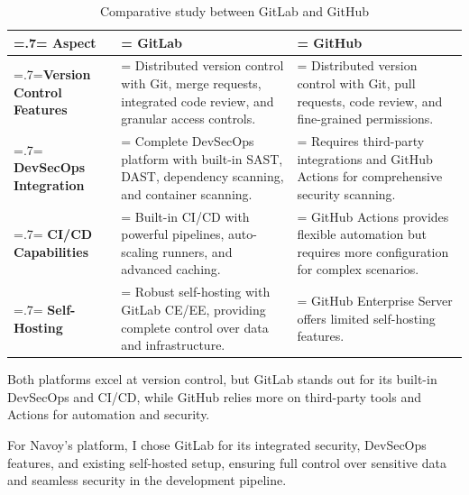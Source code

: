 \begin{table}[H]
    \renewcommand{\arraystretch}{1.5}%
    \caption{Comparative study between GitLab and GitHub}
    \centering
    \medskip
    \begin{tabularx}{1\textwidth} {
            | >{\hsize=.7\hsize\linewidth=\hsize\centering\arraybackslash}X
            | >{\hsize=1.15\hsize\linewidth=\hsize\justifying\arraybackslash}X
            | >{\hsize=1.15\hsize\linewidth=\hsize\justifying\arraybackslash}X |}
        \hline
        \rowcolor{primary} \textbf {Aspect} & \textbf {GitLab}                                                                                                      & \textbf {GitHub}                                                                                             \\
        \hline
        \textbf {Version Control Features}  & \noindent Distributed version control with Git, merge requests, integrated code review, and granular access controls. & \noindent Distributed version control with Git, pull requests, code review, and fine-grained permissions.    \\
        \hline
        \textbf {DevSecOps Integration}     & \noindent Complete DevSecOps platform with built-in SAST, DAST, dependency scanning, and container scanning.          & \noindent Requires third-party integrations and GitHub Actions for comprehensive security scanning.          \\
        \hline
        \textbf {CI/CD Capabilities}        & \noindent Built-in CI/CD with powerful pipelines, auto-scaling runners, and advanced caching.                         & \noindent GitHub Actions provides flexible automation but requires more configuration for complex scenarios. \\
        \hline
        \textbf {Self-Hosting}              & \noindent Robust self-hosting with GitLab CE/EE, providing complete control over data and infrastructure.             & \noindent GitHub Enterprise Server offers limited self-hosting features.                                     \\
        \hline
    \end{tabularx}
\end{table}

Both platforms excel at version control, but GitLab stands out for its built-in DevSecOps and CI/CD, while GitHub relies more on third-party tools and Actions for automation and security.

For Navoy's platform, I chose GitLab for its integrated security, DevSecOps features, and existing self-hosted setup, ensuring full control over sensitive data and seamless security in the development pipeline.

